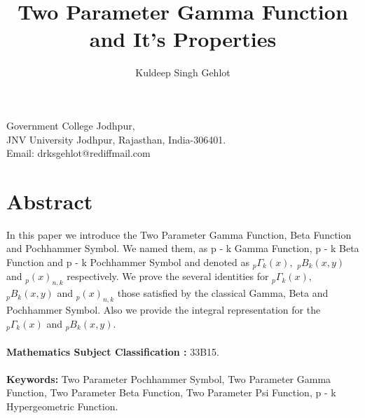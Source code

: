 \documentclass[11pt,a4paper]{article}
\author{Kuldeep Singh Gehlot}
\title{Two Parameter Gamma Function and It's Properties }
\numberwithin{equation}{section}
\begin{document}
\maketitle
\begin{center}
Government College Jodhpur,\\
JNV University Jodhpur, Rajasthan, India-306401.\\
Email: drksgehlot@rediffmail.com
\end{center}
\section*{Abstract}
In this paper we introduce the Two Parameter Gamma Function, Beta Function and Pochhammer Symbol. We named them, as p - k Gamma Function, p - k Beta Function and p - k Pochhammer Symbol and denoted as $ _{p}\Gamma_{k}(x), $  $ _{p}B_{k}(x,y) $ and $ _{p}(x)_{n,k} $ respectively. We prove the several identities for $ _{p}\Gamma_{k}(x), $  $ _{p}B_{k}(x,y) $ and $ _{p}(x)_{n,k} $ those satisfied by the classical Gamma, Beta and Pochhammer Symbol. Also we provide the integral representation for the $ _{p}\Gamma_{k}(x) $ and  $ _{p}B_{k}(x,y) $.\\\\
\textbf{Mathematics Subject Classification :} 33B15.\\\\
\textbf{Keywords:} Two Parameter Pochhammer Symbol, Two Parameter Gamma Function, Two Parameter Beta Function, Two Parameter Psi Function, p - k Hypergeometric Function. 
\end{document}
